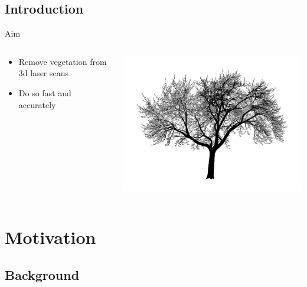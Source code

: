 \documentclass[compress]{beamer}
\begin{document}
\subsection*{Introduction}
\begin{frame}{Aim}

\begin{columns}[T]
\begin{column}{0.5\textwidth}

\begin{itemize}
\item  Remove vegetation from 3d laser scans
\item  Do so fast and accurately
\end{itemize}

\end{column}
\begin{column}{0.5\textwidth}

\includegraphics[width=1\textwidth]{pics/tree1}

\end{column}
\end{columns}


\end{frame}

\section{Motivation}

\subsection{Background}
\end{document}
